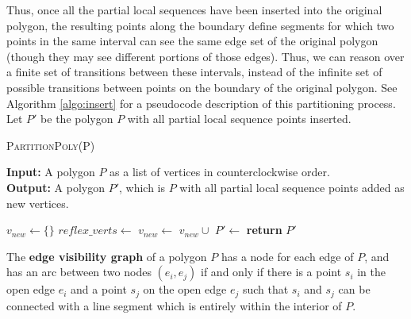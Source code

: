 \documentclass[]{styles/svproc}  %
\begin{document}
Thus, once all the partial local sequences have been inserted into the original
polygon, the resulting points along the boundary define segments for which two points in the same interval can see the same edge set of the
original polygon (though they may see different portions of those edges). Thus,
we can reason over a finite set of transitions between these intervals, instead
of the infinite set of possible transitions between points on the boundary of
the original polygon. See Algorithm \ref{algo:insert} for a pseudocode
description of this partitioning process. Let $P'$ be the polygon $P$ with all partial local sequence points inserted.

\begin{algorithm}
\caption{\textsc{PartitionPoly}(P)}
\label{algo:insert}
\hspace*{\algorithmicindent} \textbf{Input:} A polygon $P$ as a list of
vertices in counterclockwise order.\\
\hspace*{\algorithmicindent} \textbf{Output:} A polygon $P'$, which is $P$ with
all partial local sequence points added as new vertices.
\begin{algorithmic}[1]
\State $v_{new} \gets \{\}$
\State $reflex\_verts \gets$ 
        \State $v_{new} \gets$ $v_{new} \cup$ 
    \EndFor
\EndFor
\State $P' \gets$ 
\State \textbf{return} $P'$
\end{algorithmic}
\end{algorithm}


\begin{definition}
The \textbf{edge visibility graph} of a polygon $P$ has a node for each edge of
$P$, and has an arc between two nodes $(e_i, e_j)$ if and only if there is a
point $s_i$ in the open edge $e_i$ and a point $s_j$ on the open edge $e_j$ such
that $s_i$ and $s_j$ can be connected with a line segment which is entirely
within the interior of $P$.
\end{definition}

%
%
%
\end{document}

